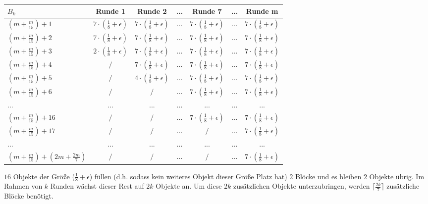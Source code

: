 \documentclass{article}
\begin{document}
\begin{center}
  \begin{tabular}{| l | c | c | c | c | c | c |  }
    \hline
    $B_{k}$ & Runde 1 & Runde 2 & ... & Runde 7 & ... & Runde m\\ \hline
    $(m+\frac{m}{15})+1$ & $7\cdot(\frac{1}{8}+\epsilon)$ & $7\cdot(\frac{1}{8}+\epsilon)$ & $...$ & $7\cdot(\frac{1}{8}+\epsilon)$ & $...$ & $7\cdot(\frac{1}{8}+\epsilon)$ \\ \hline
    $(m+\frac{m}{15})+2$ & $7\cdot(\frac{1}{8}+\epsilon)$ & $7\cdot(\frac{1}{8}+\epsilon)$ & $...$ & $7\cdot(\frac{1}{8}+\epsilon)$ & $...$ & $7\cdot(\frac{1}{8}+\epsilon)$  \\ \hline
    $(m+\frac{m}{15})+3$ & $2\cdot(\frac{1}{8}+\epsilon)$ & $7\cdot(\frac{1}{8}+\epsilon)$ & $...$ & $7\cdot(\frac{1}{8}+\epsilon)$ & $...$ & $7\cdot(\frac{1}{8}+\epsilon)$  \\ \hline
    $(m+\frac{m}{15})+4$ & $/$ & $7\cdot(\frac{1}{8}+\epsilon)$ & $...$ & $7\cdot(\frac{1}{8}+\epsilon)$ & $...$ & $7\cdot(\frac{1}{8}+\epsilon)$  \\ \hline
    $(m+\frac{m}{15})+5$ & $/$ & $4\cdot(\frac{1}{8}+\epsilon)$ & $...$ & $7\cdot(\frac{1}{8}+\epsilon)$ & $...$ & $7\cdot(\frac{1}{8}+\epsilon)$  \\ \hline
 	$(m+\frac{m}{15})+6$ & $/$ & $/$ & $...$ & $7\cdot(\frac{1}{8}+\epsilon)$ & $...$ & $7\cdot(\frac{1}{8}+\epsilon)$  \\ \hline
    $...$  & $...$ & $...$ & $...$ & $...$ & $...$ & $...$  \\ \hline
    $(m+\frac{m}{15})+16$ & $/$ & $/$ & $...$ & $7\cdot(\frac{1}{8}+\epsilon)$ & $...$ & $7\cdot(\frac{1}{8}+\epsilon)$ \\ \hline
      $(m+\frac{m}{15})+17$ & $/$ & $/$ & $...$ & $/$ & $...$ & $7\cdot(\frac{1}{8}+\epsilon)$ \\ \hline
    $...$ & $...$ & $...$ & $...$ & $...$ & $...$ & $...$  \\ \hline
    $(m+\frac{m}{15})+(2m+\frac{2m}{7})$ & $/$ & $/$ & $...$ & $/$ & $...$ & $7\cdot(\frac{1}{8}+\epsilon)$  \\ \hline
    \hline
  \end{tabular}
\end{center}

$16$ Objekte der Größe ($\frac{1}{8}+\epsilon$) füllen (d.h. sodass kein weiteres Objekt dieser Größe Platz hat)  $2$ Blöcke und es bleiben $2$ Objekte übrig. Im Rahmen von $k$ Runden wächst dieser Rest auf $2k$ Objekte an. Um diese $2k$ zusätzlichen Objekte unterzubringen, werden $\lceil\frac{2k}{7}\rceil$ zusätzliche Blöcke benötigt.
\end{document}
